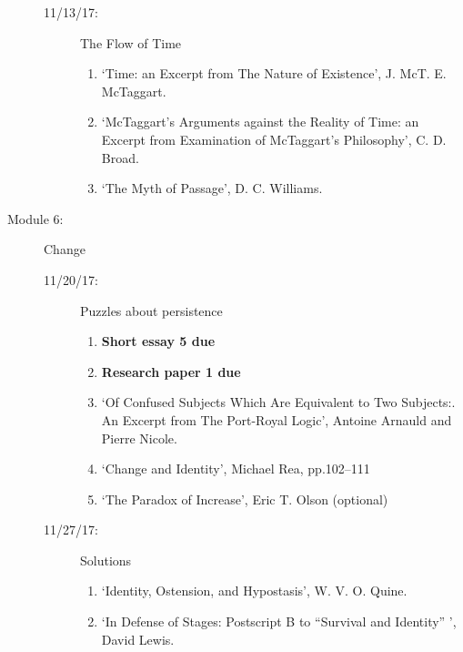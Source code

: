 \documentclass[article,oneside]{memoir}
\begin{document}
\begin{description}
\begin{description}
\item[11/13/17:] The Flow of Time
\begin{enumerate}
\item `Time: an Excerpt from The Nature of Existence', J. McT. E. McTaggart.
\item `McTaggart’s Arguments against the Reality of Time: an Excerpt from Examination of McTaggart’s Philosophy', C. D. Broad.
\item `The Myth of Passage', D. C. Williams.
\end{enumerate}
\end{description}

\item[Module 6:] Change
\begin{description}
\item[11/20/17:] Puzzles about persistence
\begin{enumerate}
\item \textbf{Short essay 5 due}
\item \textbf{Research paper 1 due}
\item `Of Confused Subjects Which Are Equivalent to Two Subjects:. An Excerpt from The Port-Royal Logic', Antoine Arnauld and Pierre Nicole. 
\item `Change and Identity', Michael Rea, pp.102--111 
\item `The Paradox of Increase', Eric T. Olson (optional)
\end{enumerate}
\item[11/27/17:] Solutions
\begin{enumerate}
 \item `Identity, Ostension, and Hypostasis', W. V. O. Quine.
\item `In Defense of Stages: Postscript B to ``Survival and Identity'' ', David Lewis.
\end{enumerate}
\end{description}


\end{description}
\end{document}

